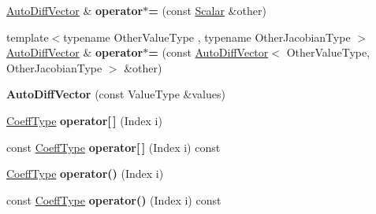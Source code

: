 \begin{DoxyCompactItemize}
\item 
\mbox{\label{class_eigen_1_1_auto_diff_vector_ab2de57504c49deaf117ae61d3ccce06e}} 
\hyperlink{class_eigen_1_1_auto_diff_vector}{Auto\+Diff\+Vector} \& {\bfseries operator$\ast$=} (const \hyperlink{class_eigen_1_1_auto_diff_scalar}{Scalar} \&other)
\item 
\mbox{\label{class_eigen_1_1_auto_diff_vector_abbe56ed8af87801f3315665668544660}} 
{\footnotesize template$<$typename Other\+Value\+Type , typename Other\+Jacobian\+Type $>$ }\\\hyperlink{class_eigen_1_1_auto_diff_vector}{Auto\+Diff\+Vector} \& {\bfseries operator$\ast$=} (const \hyperlink{class_eigen_1_1_auto_diff_vector}{Auto\+Diff\+Vector}$<$ Other\+Value\+Type, Other\+Jacobian\+Type $>$ \&other)
\item 
\mbox{\label{class_eigen_1_1_auto_diff_vector_a4427a857c98519614c6eb3f643f76e77}} 
{\bfseries Auto\+Diff\+Vector} (const Value\+Type \&values)
\item 
\mbox{\label{class_eigen_1_1_auto_diff_vector_a45afba6ef103699021bae60557dcc43c}} 
\hyperlink{class_eigen_1_1_auto_diff_scalar}{Coeff\+Type} {\bfseries operator\mbox{[}$\,$\mbox{]}} (Index i)
\item 
\mbox{\label{class_eigen_1_1_auto_diff_vector_a50fd1a00b5bbb6ad78c93537173f035b}} 
const \hyperlink{class_eigen_1_1_auto_diff_scalar}{Coeff\+Type} {\bfseries operator\mbox{[}$\,$\mbox{]}} (Index i) const
\item 
\mbox{\label{class_eigen_1_1_auto_diff_vector_ae34829cdff8ec421a2468805c1f9a265}} 
\hyperlink{class_eigen_1_1_auto_diff_scalar}{Coeff\+Type} {\bfseries operator()} (Index i)
\item 
\mbox{\label{class_eigen_1_1_auto_diff_vector_a830625bf5751aab2c7e18dd514140908}} 
const \hyperlink{class_eigen_1_1_auto_diff_scalar}{Coeff\+Type} {\bfseries operator()} (Index i) const
\item 
\mbox{\label{class_eigen_1_1_auto_diff_vector_a3e932caba9f4d4c131caab80e255f97d}} 

\end{DoxyCompactItemize}
